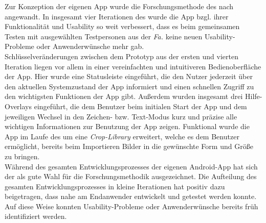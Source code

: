 Zur Konzeption der eigenen App wurde die Forschungsmethode des \hcdp{} nach \citet{Norman13} angewandt.
In insgesamt vier Iterationen des \hcdp{} wurde die App bzgl. ihrer Funktionalität und Usability so weit verbessert, dass es beim gemeinsamen Testen mit ausgewählten Testpersonen aus der \emph{Fa.} \vr{} keine neuen Usability-Probleme oder Anwenderwünsche mehr gab. \\

Schlüsselveränderungen zwischen dem Prototyp aus der ersten und vierten Iteration liegen vor allem in einer vereinfachten und intuitiveren Bedienoberfläche der App.
Hier wurde eine Statusleiste eingeführt, die den Nutzer jederzeit über den aktuellen Systemzustand der App informiert und einen schnellen Zugriff zu den wichtigsten Funktionen der App gibt.
Außerdem wurden insgesamt drei Hilfe-Overlays eingeführt, die dem Benutzer beim initialen Start der App und dem jeweiligen Wechsel in den Zeichen- bzw. Text-Modus kurz und präzise alle wichtigen Informationen zur Benutzung der App zeigen.
Funktional wurde die App im Laufe des \hcdp{} um eine \emph{Crop-Library} erweitert, welche es dem Benutzer ermöglicht, bereits beim Importieren Bilder in die gewünschte Form und Größe zu bringen. \\

Während des gesamten Entwicklungsprozesses der eigenen Android-App hat sich der \hcdp{} als gute Wahl für die Forschungsmethodik ausgezeichnet.
Die Aufteilung des gesamten Entwicklungsprozesses in kleine Iterationen hat positiv dazu beigetragen, dass nahe am Endanwender entwickelt und getestet werden konnte.
Auf diese Weise konnten Usability-Probleme oder Anwenderwünsche bereits früh identifiziert werden.

